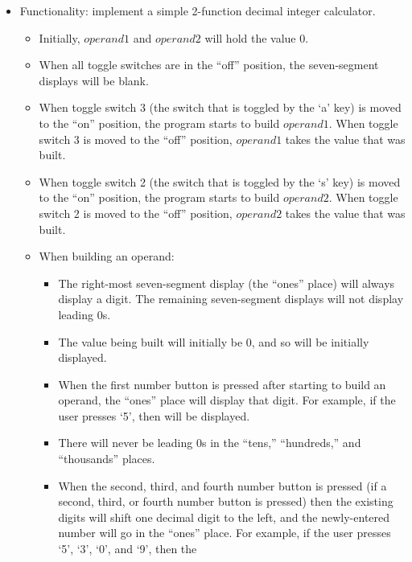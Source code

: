 \documentclass[12pt]{article}
\begin{document}
\begin{itemize}
    \item Functionality: implement a simple 2-function decimal integer
        calculator.
    \begin{itemize}
        \item Initially, $operand1$ and $operand2$ will hold the
            value $0$.
        \item When all toggle switches are in the ``off'' position, the
            seven-segment displays will be blank.
        \item When toggle switch 3 (the switch that is toggled by the `a' key)
            is moved to the ``on'' position, the program starts to build
            $operand1$. When toggle switch 3 is moved to the ``off''
            position, $operand1$ takes the value that was built.
        \item When toggle switch 2 (the switch that is toggled by the `s' key)
            is moved to the ``on'' position, the program starts to build
            $operand2$. When toggle switch 2 is moved to the ``off''
            position, $operand2$ takes the value that was built.
        \item When building an operand:
        \begin{itemize}
            \item The right-most seven-segment display (the ``ones'' place)
                will always display a digit. The remaining seven-segment
                displays will not display leading $0$s.
            \item The value being built will initially be $0$, and so {} will be initially displayed.
            \item When the first number button is pressed after starting to
                build an operand, the ``ones'' place will display that digit.
                For example, if the user presses `5', then {} will be
                displayed.
            \item There will never be leading $0$s in the ``tens,''
                ``hundreds,'' and ``thousands'' places.
            \item When the second, third, and fourth number button is pressed
                (if a second, third, or fourth number button is pressed) then
                the existing digits will shift one decimal digit to the left,
                and the newly-entered number will go in the ``ones'' place. For
                example, if the user presses `5', `3', `0', and `9', then the

\end{itemize}
\end{itemize}
\end{itemize}
\end{document}
